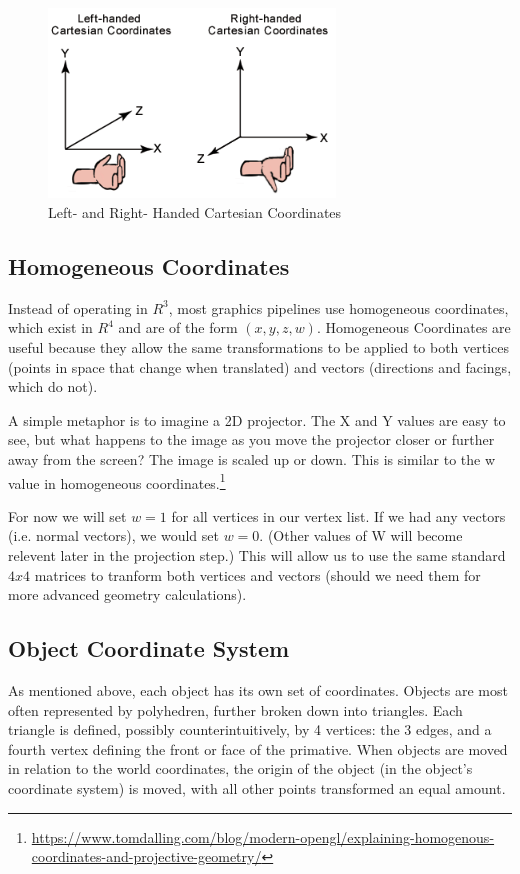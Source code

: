 \documentclass{article}
\begin{document}
\begin{figure}[H]
    \centering
    \includegraphics[width=3.0in]{leftrght.png}
    \caption{Left- and Right- Handed Cartesian Coordinates}
    \label{LeftRight}
\end{figure}

\subsection{Homogeneous Coordinates}
Instead of operating in $R^3$, most graphics pipelines use homogeneous coordinates, which exist in $R^4$ and are of the form $(x, y, z, w)$. Homogeneous Coordinates are useful because they allow the same transformations to be applied to both vertices (points in space that change when translated) and vectors (directions and facings, which do not).

A simple metaphor is to imagine a 2D projector. The X and Y values are easy to see, but what happens to the image as you move the projector closer or further away from the screen? The image is scaled up or down. This is similar to the w value in homogeneous coordinates.\footnote{\url{https://www.tomdalling.com/blog/modern-opengl/explaining-homogenous-coordinates-and-projective-geometry/}} 

For now we will set $w = 1$ for all vertices in our vertex list. If we had any vectors (i.e. normal vectors), we would set $w = 0$. (Other values of W will become relevent later in the projection step.) This will allow us to use the same standard $4x4$ matrices to tranform both vertices and vectors (should we need them for more advanced geometry calculations).

\subsection{Object Coordinate System}
As mentioned above, each object has its own set of coordinates. Objects are most often represented by polyhedren, further broken down into triangles. Each triangle is defined, possibly counterintuitively, by 4 vertices: the 3 edges, and a fourth vertex defining the front or face of the primative. When objects are moved in relation to the world coordinates, the origin of the object (in the object's coordinate system) is moved, with all other points transformed an equal amount.
\end{document}
